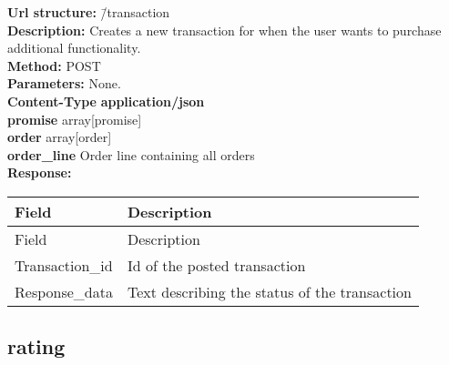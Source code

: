\documentclass[11pt]{article}
\begin{document}
\begin{tabbing}
\textcolor{black!60}{\textbf{Url structure:}} \hspace{0.2in} \= /transaction \\
\textcolor{black!60}{\textbf{Description:}}  \> Creates a new transaction for when the user wants to purchase \\ \> additional functionality. \\
\textcolor{black!60}{\textbf{Method:}} \> POST \\
\textcolor{black!60}{\textbf{Parameters:}} \> None. \\
\textcolor{black!60}{\textbf{Content-Type}} \> \textbf{application/json} \\
\> \textbf{promise} array[promise] \\
\> \textbf{order} array[order] \\
\> \textbf{order\_line} Order line containing all orders \\
\textcolor{black!60}{\textbf{Response:}} \\ \>
\begin{tabular}{|l|l|}
\hline
 Field        &  Description                                       \\
\hline
 Field                        &  Description                                    \\
\hline
 Transaction\_id  &  Id of the posted transaction                   \\
 Response\_data   &  Text describing the status of the transaction  \\
\hline
\end{tabular}
\end{tabbing}



\subsection{rating}
\label{sec-1-6}
\end{document}
